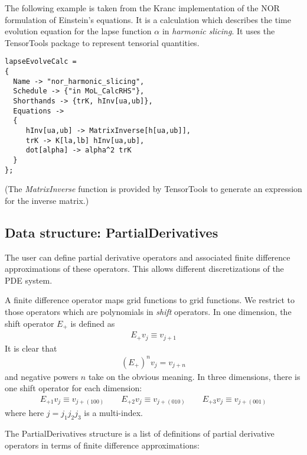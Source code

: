 \documentclass{report}
\begin{document}
The following example is taken from the Kranc implementation of the
NOR formulation of Einstein's equations.  It is a calculation which
describes the time evolution equation for the lapse function $\alpha$
in {\em harmonic slicing}.  It uses the TensorTools package to
represent tensorial quantities.

\begin{center}
\begin{minipage}{0.8 \textwidth}
\begin{verbatim}
lapseEvolveCalc = 
{
  Name -> "nor_harmonic_slicing",
  Schedule -> {"in MoL_CalcRHS"},
  Shorthands -> {trK, hInv[ua,ub]},
  Equations -> 
  {
     hInv[ua,ub] -> MatrixInverse[h[ua,ub]],
     trK -> K[la,lb] hInv[ua,ub],
     dot[alpha] -> alpha^2 trK
  }
};
\end{verbatim}
\end{minipage}
\end{center}
(The {\it MatrixInverse} function is provided by TensorTools to
generate an expression for the inverse matrix.)



\subsection{Data structure: PartialDerivatives}

The user can define partial derivative operators and associated finite
difference approximations of these operators.  This allows different
discretizations of the PDE system.

A finite difference operator maps grid functions to grid functions.
We restrict to those operators which are polynomials in {\em shift}
operators.  In one dimension, the shift operator $E_+$ is defined as 
\begin{eqnarray}
E_+ v_j \equiv v_{j+1}
\end{eqnarray}
It is clear that
\begin{eqnarray}
(E_+)^n v_j = v_{j+n}
\end{eqnarray}
and negative powers $n$ take on the obvious meaning.  In three
dimensions, there is one shift operator for each dimension:
\begin{eqnarray}
E_{+1} v_j \equiv v_{j+(100)} \qquad
E_{+2} v_j \equiv v_{j+(010)} \qquad
E_{+3} v_j \equiv v_{j+(001)}
\end{eqnarray}
where here $j = j_1 j_2 j_3$ is a multi-index.

The PartialDerivatives structure is a list of definitions of partial
derivative operators in terms of finite difference approximations:
\end{document}
